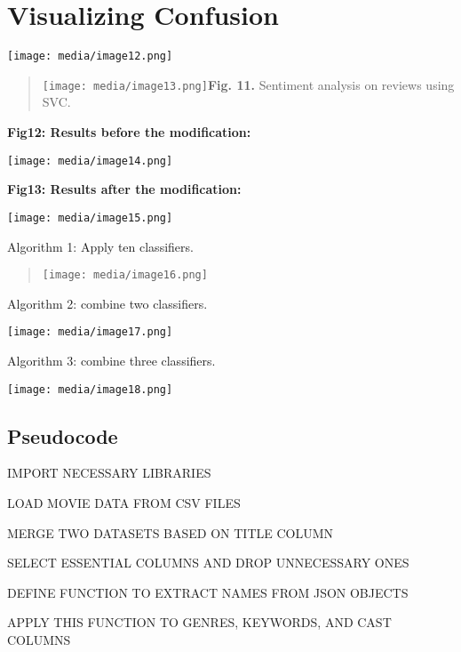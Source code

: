 \documentclass[
]{article}
\begin{document}
\hypertarget{visualizing-confusion}{%
\section{\texorpdfstring{\textbf{Visualizing
Confusion}}{Visualizing Confusion}}\label{visualizing-confusion}}

\texttt{[image: media/image12.png]}

\begin{quote}
\texttt{[image: media/image13.png]}\protect\hypertarget{_bookmark19}{}{}\textbf{Fig.
11.} Sentiment analysis on reviews using SVC.
\end{quote}

\textbf{Fig12: Results before the modification:}

\texttt{[image: media/image14.png]}

\textbf{Fig13: Results after the modification:}

\texttt{[image: media/image15.png]}

Algorithm 1: Apply ten classifiers.

\begin{quote}
\texttt{[image: media/image16.png]}
\end{quote}

Algorithm 2: combine two classifiers.

\texttt{[image: media/image17.png]}

Algorithm 3: combine three classifiers.

\texttt{[image: media/image18.png]}

\hypertarget{pseudocode}{%
\subsection{Pseudocode}\label{pseudocode}}

IMPORT NECESSARY LIBRARIES

LOAD MOVIE DATA FROM CSV FILES

MERGE TWO DATASETS BASED ON TITLE COLUMN

SELECT ESSENTIAL COLUMNS AND DROP UNNECESSARY ONES

DEFINE FUNCTION TO EXTRACT NAMES FROM JSON OBJECTS

APPLY THIS FUNCTION TO GENRES, KEYWORDS, AND CAST COLUMNS
\end{document}
